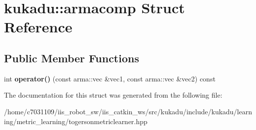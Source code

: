 \hypertarget{structkukadu_1_1armacomp}{\section{kukadu\-:\-:armacomp Struct Reference}
\label{structkukadu_1_1armacomp}
}
\subsection*{Public Member Functions}
\begin{DoxyCompactItemize}
\item 
\hypertarget{structkukadu_1_1armacomp_ae171e976c645755c8b316d864f778c5e}{int {\bfseries operator()} (const arma\-::vec \&vec1, const arma\-::vec \&vec2) const }\label{structkukadu_1_1armacomp_ae171e976c645755c8b316d864f778c5e}

\end{DoxyCompactItemize}


The documentation for this struct was generated from the following file\-:\begin{DoxyCompactItemize}
\item 
/home/c7031109/iis\-\_\-robot\-\_\-sw/iis\-\_\-catkin\-\_\-ws/src/kukadu/include/kukadu/learning/metric\-\_\-learning/togersonmetriclearner.\-hpp\end{DoxyCompactItemize}
